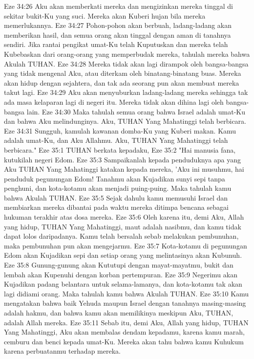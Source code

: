 Eze 34:26  Aku akan memberkati mereka dan mengizinkan mereka tinggal di sekitar bukit-Ku yang suci. Mereka akan Kuberi hujan bila mereka memerlukannya.
Eze 34:27  Pohon-pohon akan berbuah, ladang-ladang akan memberikan hasil, dan semua orang akan tinggal dengan aman di tanahnya sendiri. Jika rantai pengikat umat-Ku telah Kuputuskan dan mereka telah Kubebaskan dari orang-orang yang memperbudak mereka, tahulah mereka bahwa Akulah TUHAN.
Eze 34:28  Mereka tidak akan lagi dirampok oleh bangsa-bangsa yang tidak mengenal Aku, atau diterkam oleh binatang-binatang buas. Mereka akan hidup dengan sejahtera, dan tak ada seorang pun akan membuat mereka takut lagi.
Eze 34:29  Aku akan menyuburkan ladang-ladang mereka sehingga tak ada masa kelaparan lagi di negeri itu. Mereka tidak akan dihina lagi oleh bangsa-bangsa lain.
Eze 34:30  Maka tahulah semua orang bahwa Israel adalah umat-Ku dan bahwa Aku melindunginya. Aku, TUHAN Yang Mahatinggi telah berbicara.
Eze 34:31  Sungguh, kamulah kawanan domba-Ku yang Kuberi makan. Kamu adalah umat-Ku, dan Aku Allahmu. Aku, TUHAN Yang Mahatinggi telah berbicara."
Eze 35:1  TUHAN berkata kepadaku,
Eze 35:2  "Hai manusia fana, kutukilah negeri Edom.
Eze 35:3  Sampaikanlah kepada penduduknya apa yang Aku TUHAN Yang Mahatinggi katakan kepada mereka, 'Aku ini musuhmu, hai penduduk pegunungan Edom! Tanahmu akan Kujadikan sunyi sepi tanpa penghuni, dan kota-kotamu akan menjadi puing-puing. Maka tahulah kamu bahwa Akulah TUHAN.
Eze 35:5  Sejak dahulu kamu memusuhi Israel dan membiarkan mereka dibantai pada waktu mereka ditimpa bencana sebagai hukuman terakhir atas dosa mereka.
Eze 35:6  Oleh karena itu, demi Aku, Allah yang hidup, TUHAN Yang Mahatinggi, maut adalah nasibmu, dan kamu tidak dapat lolos daripadanya. Kamu telah bersalah sebab melakukan pembunuhan, maka pembunuhan pun akan mengejarmu.
Eze 35:7  Kota-kotamu di pegunungan Edom akan Kujadikan sepi dan setiap orang yang melintasinya akan Kubunuh.
Eze 35:8  Gunung-gunung akan Kututupi dengan mayat-mayatmu, bukit dan lembah akan Kupenuhi dengan korban pertempuran.
Eze 35:9  Negerimu akan Kujadikan padang belantara untuk selama-lamanya, dan kota-kotamu tak akan lagi didiami orang. Maka tahulah kamu bahwa Akulah TUHAN.
Eze 35:10  Kamu mengatakan bahwa baik Yehuda maupun Israel dengan tanahnya masing-masing adalah hakmu, dan bahwa kamu akan memilikinya meskipun Aku, TUHAN, adalah Allah mereka.
Eze 35:11  Sebab itu, demi Aku, Allah yang hidup, TUHAN Yang Mahatinggi, Aku akan membalas dendam kepadamu, karena kamu marah, cemburu dan benci kepada umat-Ku. Mereka akan tahu bahwa kamu Kuhukum karena perbuatanmu terhadap mereka.
